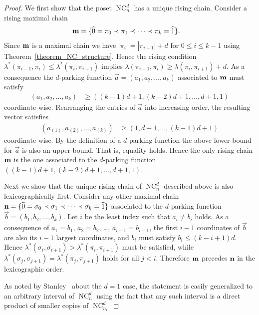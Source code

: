\documentclass[11pt]{amsart}
\numberwithin{equation}{section}
\newcommand{\hz}{\widehat{0}}
\newcommand{\ho}{\widehat{1}}
\newcommand{\coveredby}{\prec}
\DeclareMathOperator{\NC}{NC}
\begin{document}
\begin{proof}
We first show that the poset $\NC^{d}_{n}$ has a unique rising
chain. Consider a rising maximal chain
\begin{align*}
  {\bf m} & = \{\hz = \pi_{0} \coveredby \pi_{1} \coveredby \cdots \coveredby \pi_{k} = \ho\} .
\end{align*}
Since ${\bf m}$ is a maximal chain we have
$|\pi_{i}|=|\pi_{i+1}|+d$ for $0 \leq i \leq k-1$
using Theorem~\ref{theorem_NC_structure}.
Hence the rising condition 
$\lambda^{*}(\pi_{i-1},\pi_{i}) \leq \lambda^{*}(\pi_{i},\pi_{i+1})$
implies
$\lambda(\pi_{i-1},\pi_{i}) \geq \lambda(\pi_{i},\pi_{i+1}) + d$.
As a consequence the $d$-parking function
$\vec{a} = (a_{1}, a_{2}, \ldots, a_{k})$ associated to ${\bf m}$ must satisfy
\begin{align*}
(a_{1}, a_{2}, \ldots, a_{k}) & \geq ((k-1)d+1, (k-2)d+1, \ldots,d+1, 1)
\end{align*}
coordinate-wise. Rearranging the entries of $\vec{a}$ into increasing
order, the resulting vector satisfies
\begin{align*}
(a_{(1)}, a_{(2)}, \ldots, a_{(k)}) & \geq (1, d+1,\ldots, (k-1)d+1)
\end{align*}
coordinate-wise.
By the definition of a $d$-parking function
the above lower bound for $\vec{a}$ is also an upper bound.
That is, equality holds.
Hence the only rising chain ${\bf m}$ is the one
associated to the $d$-parking function
$((k-1)d+1, (k-2)d+1, \ldots,d+1, 1)$.

Next we show that the unique rising chain of $\NC^{d}_{n}$
described above is also lexicographically first. Consider any other
maximal chain 
${\bf n} = \{\hz = \sigma_{0} \coveredby \sigma_{1} \coveredby \cdots \coveredby \sigma_{k} = \ho\}$
associated to the $d$-parking function $\vec{b} = (b_{1}, b_{2}, \ldots,
b_{k})$. Let $i$ be the least index such that $a_{i}\neq b_{i}$
holds. As a consequence of $a_{1}=b_{1}$, $a_{2}=b_{2}$, \ldots,
$a_{i-1}=b_{i-1}$, the first $i-1$ coordinates of $\vec{b}$ are also its
$i-1$ largest coordinates, and $b_{i}$ must satisfy $b_{i}\leq
(k-i+1)d$. Hence
$\lambda^{*}(\sigma_{i},\sigma_{i+1})>\lambda^{*}(\pi_{i},\pi_{i+1})$ must
be satisfied, while
$\lambda^{*}(\sigma_{j},\sigma_{j+1})=\lambda^{*}(\pi_{j},\pi_{j+1})$ holds
for all $j<i$. Therefore ${\bf m}$ precedes ${\bf n}$ in the
lexicographic order.

As noted by Stanley~\cite{Stanley} about the $d=1$ case, the statement
is easily generalized to an arbitrary interval of $\NC^{d}_{n}$ using
the fact that any such interval is a direct product of smaller copies of
$\NC^{d}_{n_{i}}$
\end{proof}  
\end{document}
